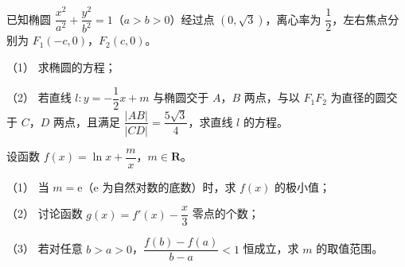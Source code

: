 \begin{question}
已知椭圆 $\dfrac{x^2}{a^2}+\dfrac{y^2}{b^2}=1$（$a>b>0$）经过点 $\left(0,\sqrt3\right)$，离心率为 $\dfrac12$，左右焦点分别为 $F_1(-c,0)$，$F_2(c,0)$。
\nopagebreak[4]
\begin{center}\end{center}
\nopagebreak[4]
（1） 求椭圆的方程；

（2） 若直线 $l:y=-\dfrac12x+m$ 与椭圆交于 $A$，$B$ 两点，与以 $F_1F_2$ 为直径的圆交于 $C$，$D$ 两点，且满足 $\dfrac{|AB|}{|CD|}=\dfrac{5\sqrt3}{4}$，求直线 $l$ 的方程。

\end{question}
\begin{question}
设函数 $f(x)=\ln x+\dfrac mx$，$m\in\mathbf R$。

（1） 当 $m=\mathrm e$（$\mathrm e$ 为自然对数的底数）时，求 $f(x)$ 的极小值；

（2） 讨论函数 $g(x)=f'(x)-\dfrac x3$ 零点的个数；

（3） 若对任意 $b>a>0$，$\dfrac{f(b)-f(a)}{b-a}<1$ 恒成立，求 $m$ 的取值范围。

\end{question}